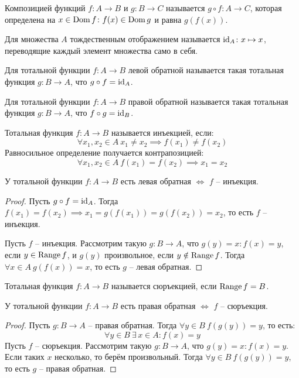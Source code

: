 \documentclass[12pt]{article}
\begin{document}
\begin{definition}
	Композицией функций $f\colon A\to B$ и $g\colon B\to C$
	называется $g\circ f\colon A\to C$, которая определена на
	$x\in \operatorname{Dom} f\colon f(x) \in \operatorname{Dom} g$ и равна $g(f(x))$.
\end{definition}
\begin{definition}
	Для множества $A$ тождественным отображением называется $\operatorname{id}_A\colon
	x\mapsto x$, переводящие каждый элемент множества само в себя.
\end{definition}
\begin{definition}
	Для тотальной функции $f\colon A\to B$ левой обратной называется
	такая тотальная функция $g\colon B\to A$, что $g\circ f=\operatorname{id}_A$.
\end{definition}
\begin{definition}
	Для тотальной функции $f\colon A\to B$ правой обратной называется
	такая тотальная функция $g\colon B\to A$, что $f\circ g=\operatorname{id}_B$.
\end{definition}
\begin{definition}
	Тотальная функция $f\colon A\to B$ называется инъекцией, если:
	\[\forall x_1, x_2 \in A\ x_1 \neq x_2\implies f(x_1)\neq
	f(x_2)\]	Равносильное определение получается контрапозицией:
	\[\forall x_1, x_2 \in A\ f(x_1)=f(x_2)\implies x_1=x_2\]
\end{definition}
\begin{lemma}
	У тотальной функции $f\colon A\to B$ есть левая обратная $\iff$ $f$
	-- инъекция.
	\begin{proof}
		Пусть $g \circ f=\operatorname{id}_A$. Тогда $f(x_1)=f(x_2)\implies
		x_1=g(f(x_1))=g(f(x_2))=x_2$, то есть $f$ -- инъекция.\par

		Пусть $f$ -- инъекция. Рассмотрим такую $g\colon B\to A$, что
		$g(y)=x\colon f(x)=y$, если $y\in \operatorname{Range} f$, и $g(y)$ произвольное,
		если $y\notin \operatorname{Range} f$. Тогда $\forall x \in A\ g(f(x))=x$, то
		есть $g$ -- левая обратная.
	\end{proof}
\end{lemma}
\begin{definition}
	Тотальная функция $f\colon A\to B$ называется сюръекцией, если $\operatorname{Range} f=B$.
\end{definition}
\begin{lemma}
	У тотальной функции $f\colon A\to B$ есть правая обратная $\iff$ $f$
	-- сюръекция.
	\begin{proof}
		Пусть $g\colon B\to A$ -- правая обратная. Тогда $\forall y\in
		B\ f(g(y))=y$, то есть:
		\[\forall y \in B\ \exists\, x\in A\colon f(x)=y\]		Пусть $f$ --
		сюръекция. Рассмотрим такую $g\colon B\to A$, что
		$g(y)=x\colon f(x)=y$. Если таких $x$ несколько, то берём
		произвольный. Тогда $\forall y\in B\ f(g(y))=y$, то есть $g$ --
		правая обратная.
	\end{proof}
\end{lemma}
\end{document}
